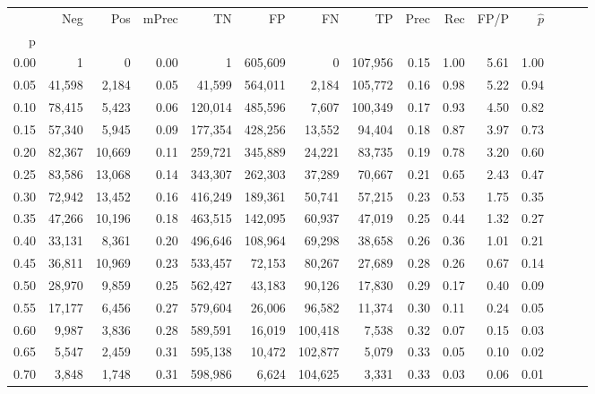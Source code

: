 \begin{tabular}{rrrrrrrrrrrrrrr}
\toprule
{} &     Neg &     Pos & mPrec &       TN &       FP &       FN &       TP &  Prec &   Rec &  FP/P & $\hat{p}$ \\
p    &         &         &       &          &          &          &          &       &       &       &           \\
\midrule
0.00 &       1 &       0 &  0.00 &        1 &  605,609 &        0 &  107,956 &  0.15 &  1.00 &  5.61 &      1.00 \\
0.05 &  41,598 &   2,184 &  0.05 &   41,599 &  564,011 &    2,184 &  105,772 &  0.16 &  0.98 &  5.22 &      0.94 \\
0.10 &  78,415 &   5,423 &  0.06 &  120,014 &  485,596 &    7,607 &  100,349 &  0.17 &  0.93 &  4.50 &      0.82 \\
0.15 &  57,340 &   5,945 &  0.09 &  177,354 &  428,256 &   13,552 &   94,404 &  0.18 &  0.87 &  3.97 &      0.73 \\
0.20 &  82,367 &  10,669 &  0.11 &  259,721 &  345,889 &   24,221 &   83,735 &  0.19 &  0.78 &  3.20 &      0.60 \\
0.25 &  83,586 &  13,068 &  0.14 &  343,307 &  262,303 &   37,289 &   70,667 &  0.21 &  0.65 &  2.43 &      0.47 \\
0.30 &  72,942 &  13,452 &  0.16 &  416,249 &  189,361 &   50,741 &   57,215 &  0.23 &  0.53 &  1.75 &      0.35 \\
0.35 &  47,266 &  10,196 &  0.18 &  463,515 &  142,095 &   60,937 &   47,019 &  0.25 &  0.44 &  1.32 &      0.27 \\
0.40 &  33,131 &   8,361 &  0.20 &  496,646 &  108,964 &   69,298 &   38,658 &  0.26 &  0.36 &  1.01 &      0.21 \\
0.45 &  36,811 &  10,969 &  0.23 &  533,457 &   72,153 &   80,267 &   27,689 &  0.28 &  0.26 &  0.67 &      0.14 \\
0.50 &  28,970 &   9,859 &  0.25 &  562,427 &   43,183 &   90,126 &   17,830 &  0.29 &  0.17 &  0.40 &      0.09 \\
0.55 &  17,177 &   6,456 &  0.27 &  579,604 &   26,006 &   96,582 &   11,374 &  0.30 &  0.11 &  0.24 &      0.05 \\
0.60 &   9,987 &   3,836 &  0.28 &  589,591 &   16,019 &  100,418 &    7,538 &  0.32 &  0.07 &  0.15 &      0.03 \\
0.65 &   5,547 &   2,459 &  0.31 &  595,138 &   10,472 &  102,877 &    5,079 &  0.33 &  0.05 &  0.10 &      0.02 \\
0.70 &   3,848 &   1,748 &  0.31 &  598,986 &    6,624 &  104,625 &    3,331 &  0.33 &  0.03 &  0.06 &      0.01 \\

\end{tabular}
